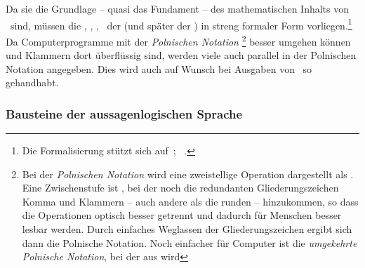 Da sie die Grundlage -- quasi das Fundament -- des mathematischen Inhalts von \ASBA\ sind, müssen die , , , \textusw\ der  (und später der ) in streng formaler Form vorliegen.\footnote{%
	Die Formalisierung stützt sich auf~\cite{bib:Aussagenlogik}; \alsoname~\cite{bib:LogikDe, bib:LogikEn}.%
}
Da Computerprogramme mit der \emph{Polnischen Notation}%
\footnote{%
	Bei der \emph{Polnischen Notation} wird eine zweistellige Operation  dargestellt als .
	Eine Zwischenstufe ist , bei der noch die redundanten Gliederungszeichen Komma und Klammern -- auch andere als die runden -- hinzukommen, so dass die Operationen optisch besser getrennt und dadurch für Menschen besser lesbar werden.
	Durch einfaches Weglassen der Gliederungszeichen ergibt sich dann die Polnische Notation.
	Noch einfacher für Computer ist die \emph{umgekehrte Polnische Notation}, bei der aus   wird%
}
besser umgehen können und Klammern dort überflüssig sind, werden viele  auch parallel in der Polnischen Notation angegeben.
Dies wird auch auf Wunsch bei Ausgaben von \ASBA\ so gehandhabt.

\subsubsection{Bausteine der aussagenlogischen Sprache}%
\label{subsub:Bausteine}

\begingroup%
\renewcommand*{\objqt}[1]{<$#1$>}%

